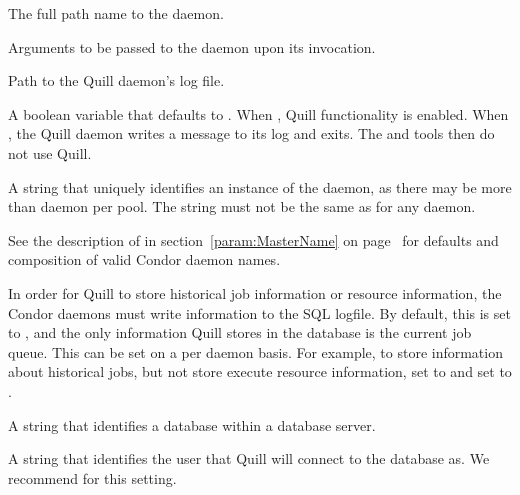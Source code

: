 \begin{description}
\label{param:Quill}
\item[\Macro{QUILL}]
  The full path name to the  daemon.

\label{param:QuillArgs}
\item[\Macro{QUILL\_ARGS}]
  Arguments to be passed to the  daemon upon its invocation.

\label{param:QuillLog}
\item[\Macro{QUILL\_LOG}]
  Path to the Quill daemon's log file.

\label{param:QuillEnabled}
\item[\Macro{QUILL\_ENABLED}]
  A boolean variable that defaults to .
  When , Quill functionality is enabled.
  When , the Quill daemon writes a message to its log and exits.
  The  and  tools then do not use Quill.

\label{param:QuillName}
\item[\Macro{QUILL\_NAME}]
  A string that uniquely identifies an instance of the 
  daemon, as there may be more than  daemon per pool.
  The string must not be the same as for any  daemon.

  See the description of  in
  section~\ref{param:MasterName} on page~\pageref{param:MasterName}
  for defaults and composition of valid Condor daemon names.

\label{param:QuillUseSQLLog}
\item[\Macro{QUILL\_USE\_SQL\_LOG}]
  In order for Quill to store historical job information or resource
  information, the Condor daemons must write information to the SQL logfile.
  By default, this is set to , and the only information Quill
  stores in the database is the current job queue.
  This can be set on a per daemon basis. For example, to store information
  about historical jobs, but not store execute resource information, set
   to  and set
   to .

\label{param:QuillDBName}
\item[\Macro{QUILL\_DB\_NAME}]
  A string that identifies a database within a database server.

\label{param:QuillDBUser}
\item[\Macro{QUILL\_DB\_USER}]
	A string that identifies the  user that Quill will
    connect to the database as.
	We recommend  for this setting. 


\end{description}
